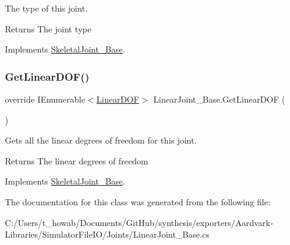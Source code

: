 The type of this joint. 

\begin{DoxyReturn}{Returns}
The joint type
\end{DoxyReturn}


Implements \hyperlink{class_skeletal_joint___base_aee155cbd483cb512bf3fc0f9a8885335}{Skeletal\+Joint\+\_\+\+Base}.

\mbox{\label{class_linear_joint___base_ad506a9bf378650ab1d6cdedab91ed2a5}} 
\subsubsection{\texorpdfstring{Get\+Linear\+D\+O\+F()}{GetLinearDOF()}}
{\footnotesize\ttfamily override I\+Enumerable$<$\hyperlink{interface_linear_d_o_f}{Linear\+D\+OF}$>$ Linear\+Joint\+\_\+\+Base.\+Get\+Linear\+D\+OF (\begin{DoxyParamCaption}{ }\end{DoxyParamCaption})\hspace{0.3cm}{\ttfamily [virtual]}}



Gets all the linear degrees of freedom for this joint. 

\begin{DoxyReturn}{Returns}
The linear degrees of freedom
\end{DoxyReturn}


Implements \hyperlink{class_skeletal_joint___base_a14564d8c44dfeef8b7a10044f2392cde}{Skeletal\+Joint\+\_\+\+Base}.



The documentation for this class was generated from the following file\+:\begin{DoxyCompactItemize}
\item 
C\+:/\+Users/t\+\_\+howab/\+Documents/\+Git\+Hub/synthesis/exporters/\+Aardvark-\/\+Libraries/\+Simulator\+File\+I\+O/\+Joints/Linear\+Joint\+\_\+\+Base.\+cs\end{DoxyCompactItemize}

